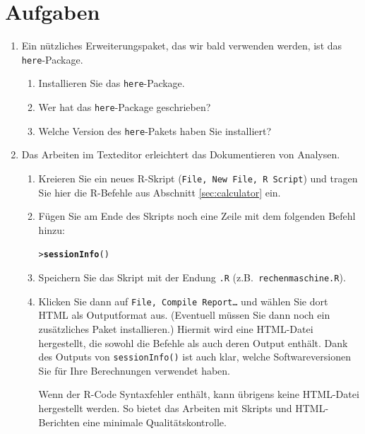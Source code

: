 \documentclass[oneside, 10pt]{book}\usepackage[]{graphicx}\usepackage[]{xcolor}
\makeatletter
\newcommand{\hlstd}[1]{\textcolor[rgb]{0.345,0.345,0.345}{#1}}%
\newcommand{\hlkwd}[1]{\textcolor[rgb]{0.737,0.353,0.396}{\textbf{#1}}}%
\newenvironment{kframe}{%
 \def\at@end@of@kframe{}%
 \ifinner\ifhmode%
  \def\at@end@of@kframe{\end{minipage}}%
  \begin{minipage}{\columnwidth}%
 \fi\fi%
 \def\FrameCommand##1{\hskip\@totalleftmargin \hskip-\fboxsep
 \colorbox{shadecolor}{##1}\hskip-\fboxsep
     \hskip-\linewidth \hskip-\@totalleftmargin \hskip\columnwidth}%
 \MakeFramed {\advance\hsize-\width
   \@totalleftmargin\z@ \linewidth\hsize
   \@setminipage}}%
 {\par\unskip\endMakeFramed%
 \at@end@of@kframe}
\newenvironment{knitrout}{}{} %
\makeatother
\begin{document}
\section{Aufgaben}
\begin{enumerate}
  \item Ein nützliches Erweiterungspaket, das wir bald verwenden werden,
  ist das \texttt{here}-Package.
  \begin{enumerate}
    \item Installieren Sie das \texttt{here}-Package.
    \item Wer hat das \texttt{here}-Package geschrieben?
    \item Welche Version des \texttt{here}-Pakets haben Sie installiert?
  \end{enumerate}
  
  \item Das Arbeiten im Texteditor erleichtert das Dokumentieren
  von Analysen.
  \begin{enumerate}
    \item Kreieren Sie ein neues R-Skript (\texttt{File, New File, R Script})
  und tragen Sie hier die R-Befehle aus Abschnitt \ref{sec:calculator} ein.
  
    \item Fügen Sie am Ende des Skripts noch eine Zeile mit dem folgenden Befehl hinzu:
\begin{knitrout}
\color{fgcolor}\begin{kframe}
\begin{alltt}
\hlstd{> }\hlkwd{sessionInfo}\hlstd{()}
\end{alltt}
\end{kframe}
\end{knitrout}

    \item Speichern Sie das Skript mit der Endung \texttt{.R}
  (z.B.\ \texttt{rechenmaschine.R}).
  
    \item Klicken Sie dann auf \texttt{File, Compile Report\dots} und wählen
  Sie dort HTML als Outputformat aus. (Eventuell müssen Sie
  dann noch ein zusätzliches Paket installieren.)
  Hiermit wird eine HTML-Datei hergestellt, die sowohl
  die Befehle als auch deren Output enthält.
  Dank des Outputs von \texttt{sessionInfo()} ist auch klar,
  welche Softwareversionen Sie für Ihre Berechnungen verwendet haben.
  
  Wenn der R-Code Syntaxfehler enthält, kann übrigens keine
  HTML-Datei hergestellt werden. So bietet das Arbeiten 
  mit Skripts und HTML-Berichten eine minimale Qualitätskontrolle.
  

\end{enumerate}
\end{enumerate}
\end{document}
